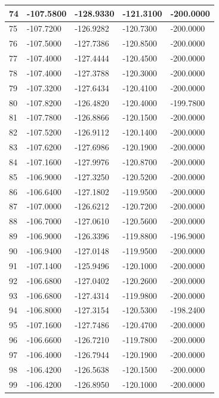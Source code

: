 \begin{longtable}{|l|l|l|l|l|}
74 & -107.5800 & -128.9330 & -121.3100 & -200.0000 \\\hline
75 & -107.7200 & -126.9282 & -120.7300 & -200.0000 \\\hline
76 & -107.5000 & -127.7386 & -120.8500 & -200.0000 \\\hline
77 & -107.4000 & -127.4444 & -120.4500 & -200.0000 \\\hline
78 & -107.4000 & -127.3788 & -120.3000 & -200.0000 \\\hline
79 & -107.3200 & -127.6434 & -120.4100 & -200.0000 \\\hline
80 & -107.8200 & -126.4820 & -120.4000 & -199.7800 \\\hline
81 & -107.7800 & -126.8866 & -120.1500 & -200.0000 \\\hline
82 & -107.5200 & -126.9112 & -120.1400 & -200.0000 \\\hline
83 & -107.6200 & -127.6986 & -120.1900 & -200.0000 \\\hline
84 & -107.1600 & -127.9976 & -120.8700 & -200.0000 \\\hline
85 & -106.9000 & -127.3250 & -120.5200 & -200.0000 \\\hline
86 & -106.6400 & -127.1802 & -119.9500 & -200.0000 \\\hline
87 & -107.0000 & -126.6212 & -120.7200 & -200.0000 \\\hline
88 & -106.7000 & -127.0610 & -120.5600 & -200.0000 \\\hline
89 & -106.9000 & -126.3396 & -119.8800 & -196.9000 \\\hline
90 & -106.9400 & -127.0148 & -119.9500 & -200.0000 \\\hline
91 & -107.1400 & -125.9496 & -120.1000 & -200.0000 \\\hline
92 & -106.6800 & -127.0402 & -120.2600 & -200.0000 \\\hline
93 & -106.6800 & -127.4314 & -119.9800 & -200.0000 \\\hline
94 & -106.8000 & -127.3154 & -120.5300 & -198.2400 \\\hline
95 & -107.1600 & -127.7486 & -120.4700 & -200.0000 \\\hline
96 & -106.6600 & -126.7210 & -119.7800 & -200.0000 \\\hline
97 & -106.4000 & -126.7944 & -120.1900 & -200.0000 \\\hline
98 & -106.4200 & -126.5638 & -120.1500 & -200.0000 \\\hline
99 & -106.4200 & -126.8950 & -120.1000 & -200.0000 \\\hline
\end{longtable}
